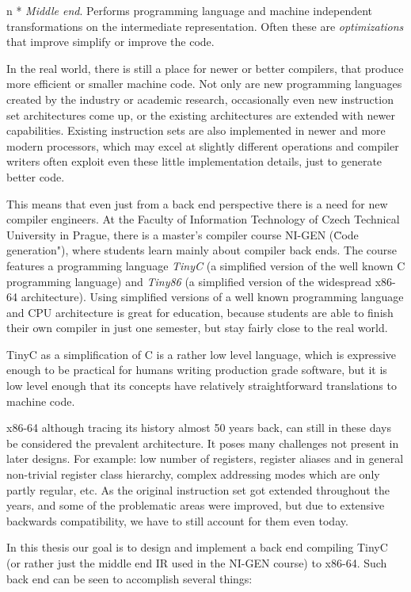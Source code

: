 \begitems \style n 
* {\em Middle end}. Performs programming language and machine independent
transformations on the intermediate representation. Often these are {\em
optimizations} that improve simplify or improve the code.
\enditems

In the real world, there is still a place for newer or better compilers, that
produce more efficient or smaller machine code. Not only are new programming
languages created by the industry or academic research, occasionally even new
instruction set architectures come up, or the existing architectures are
extended with newer capabilities. Existing instruction sets are also implemented
in newer and more modern processors, which may excel at slightly different
operations and compiler writers often exploit even these little implementation
details, just to generate better code.

This means that even just from a back end perspective there is a need for new
compiler engineers. At the Faculty of Information Technology of Czech Technical
University in Prague, there is a master's compiler course NI-GEN (\"Code
generation"), where students learn mainly about compiler back ends. The course
features a programming language {\em TinyC} (a simplified version of the well
known C programming language) and {\em Tiny86} (a simplified version of the
widespread x86-64 architecture). Using simplified versions of a well known
programming language and CPU architecture is great for education, because
students are able to finish their own compiler in just one semester, but stay
fairly close to the real world.

TinyC as a simplification of C is a rather low level language, which is
expressive enough to be practical for humans writing production grade software,
but it is low level enough that its concepts have relatively straightforward
translations to machine code.

x86-64 although tracing its history almost 50 years back, can still in these
days be considered the prevalent architecture. It poses many challenges not
present in later designs. For example: low number of registers, register aliases
and in general non-trivial register class hierarchy, complex addressing modes
which are only partly regular, etc. As the original instruction set got extended
throughout the years, and some of the problematic areas were improved, but due
to extensive backwards compatibility, we have to still account for them even
today.

In this thesis our goal is to design and implement a back end compiling TinyC
(or rather just the middle end IR used in the NI-GEN course) to x86-64. Such
back end can be seen to accomplish several things:

